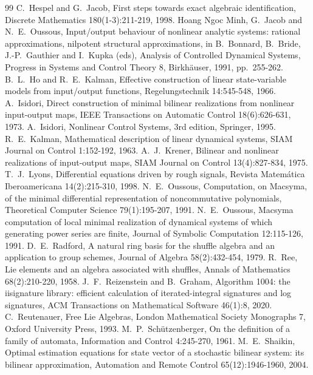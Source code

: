 \documentclass[11pt,a4paper]{article}
\theoremstyle{remark}
\begin{document}
\begin{thebibliography}{99}
 C.~Hespel and G.~Jacob, First steps towards exact algebraic identification, Discrete Mathematics 180(1-3):211-219, 1998.
 Hoang Ngoc Minh, G.~Jacob and N.~E.~Oussous, Input/output behaviour of nonlinear analytic systems: rational approximations, nilpotent structural approximations, in B.~Bonnard, B.~Bride, J.-P.~Gauthier and I.~Kupka (eds), Analysis of Controlled Dynamical Systems, Progress in Systems and Control Theory 8, Birkh\"auser, 1991, pp.~255-262.
 B.~L.~Ho and R.~E.~Kalman, Effective construction of linear state-variable models from input/output functions, Regelungstechnik 14:545-548, 1966.
 A.~Isidori, Direct construction of minimal bilinear realizations from nonlinear input-output maps, IEEE Transactions on Automatic Control 18(6):626-631, 1973.
 A.~Isidori, Nonlinear Control Systems, 3rd edition, Springer, 1995.
 R.~E.~Kalman, Mathematical description of linear dynamical systems, SIAM Journal on Control 1:152-192, 1963.
 A.~J.~Krener, Bilinear and nonlinear realizations of input-output maps, SIAM Journal on Control 13(4):827-834, 1975.
 T.~J.~Lyons, Differential equations driven by rough signals, Revista Matem\'atica Iberoamericana 14(2):215-310, 1998.
 N.~E.~Oussous, Computation, on Macsyma, of the minimal differential representation of noncommutative polynomials, Theoretical Computer Science 79(1):195-207, 1991.
 N.~E.~Oussous, Macsyma computation of local minimal realization of dynamical systems of which generating power series are finite, Journal of Symbolic Computation 12:115-126, 1991.
 D.~E.~Radford, A natural ring basis for the shuffle algebra and an application to group schemes, Journal of Algebra 58(2):432-454, 1979.
 R.~Ree, Lie elements and an algebra associated with shuffles, Annals of Mathematics 68(2):210-220, 1958.
 J.~F.~Reizenstein and B.~Graham, Algorithm 1004: the iisignature library: efficient calculation of iterated-integral signatures and log signatures, ACM Transactions on Mathematical Software 46(1):8, 2020.
 C.~Reutenauer, Free Lie Algebras, London Mathematical Society Monographs 7, Oxford University Press, 1993.
 M.~P.~Sch\"utzenberger, On the definition of a family of automata, Information and Control 4:245-270, 1961.
 M.~E.~Shaikin, Optimal estimation equations for state vector of a stochastic bilinear system: its bilinear approximation, Automation and Remote Control 65(12):1946-1960, 2004.

\end{thebibliography}
\end{document}
